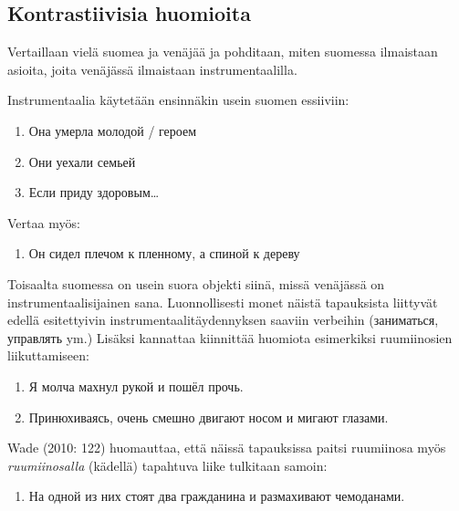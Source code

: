 \documentclass[]{scrreprt}
\providecommand{\tightlist}{%
  \setlength{\itemsep}{0pt}\setlength{\parskip}{0pt}}
\begin{document}
\subsection{Kontrastiivisia
huomioita}\label{kontrastiivisia-huomioita}

Vertaillaan vielä suomea ja venäjää ja pohditaan, miten suomessa
ilmaistaan asioita, joita venäjässä ilmaistaan instrumentaalilla.

Instrumentaalia käytetään ensinnäkin usein suomen essiiviin:

\begin{enumerate}
\def\labelenumi{(\arabic{enumi})}
\setcounter{enumi}{153}
\tightlist
\item
  Она умерла молодой / героем
\item
  Они уехали семьей
\item
  Если приду здоровым\ldots{}
\end{enumerate}

Vertaa myös:

\begin{enumerate}
\def\labelenumi{(\arabic{enumi})}
\setcounter{enumi}{156}
\tightlist
\item
  Он сидел плечом к пленному, а спиной к дереву
\end{enumerate}

Toisaalta suomessa on usein suora objekti siinä, missä venäjässä on
instrumentaalisijainen sana. Luonnollisesti monet näistä tapauksista
liittyvät edellä esitettyivin instrumentaalitäydennyksen saaviin
verbeihin (заниматься, управлять ym.) Lisäksi kannattaa kiinnittää
huomiota esimerkiksi ruumiinosien liikuttamiseen:

\begin{enumerate}
\def\labelenumi{(\arabic{enumi})}
\setcounter{enumi}{157}
\tightlist
\item
  Я молча махнул рукой и пошёл прочь.
\item
  Принюхиваясь, очень смешно двигают носом и мигают глазами.
\end{enumerate}

Wade (2010: 122) huomauttaa, että näissä tapauksissa paitsi ruumiinosa
myös \emph{ruumiinosalla} (kädellä) tapahtuva liike tulkitaan samoin:

\begin{enumerate}
\def\labelenumi{(\arabic{enumi})}
\setcounter{enumi}{159}
\tightlist
\item
  На одной из них стоят два гражданина и размахивают чемоданами.
\end{enumerate}
\end{document}

